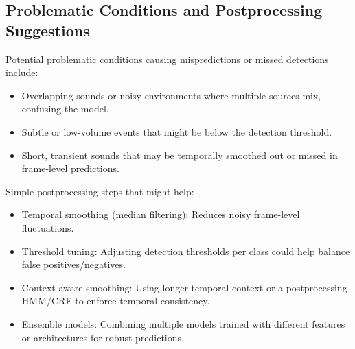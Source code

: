 \documentclass{article}
\begin{document}
\subsection{Problematic Conditions and Postprocessing Suggestions}
Potential problematic conditions causing mispredictions or missed detections include:
\begin{itemize}
    \item Overlapping sounds or noisy environments where multiple sources mix, confusing the model.
    \item Subtle or low-volume events that might be below the detection threshold.
    \item Short, transient sounds that may be temporally smoothed out or missed in frame-level predictions.
\end{itemize}
Simple postprocessing steps that might help:
\begin{itemize}
    \item Temporal smoothing (median filtering): Reduces noisy frame-level fluctuations.
    \item Threshold tuning: Adjusting detection thresholds per class could help balance false positives/negatives.
    \item Context-aware smoothing: Using longer temporal context or a postprocessing HMM/CRF to enforce temporal consistency.
    \item Ensemble models: Combining multiple models trained with different features or architectures for robust predictions.  
\end{itemize}
\end{document}
